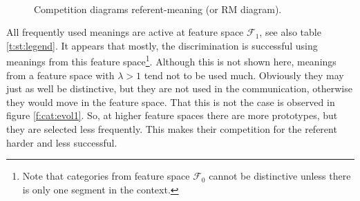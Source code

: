 \begin{figure}[t]
\centering
{}
\\
\caption{Competition diagrams referent-meaning (or RM diagram).}
\label{f:st:compRC}
\end{figure}


All frequently used meanings are active at feature space ${\mathcal F}_1$, see also table \ref{t:st:legend}. It appears that mostly, the discrimination is successful using meanings from this feature space\footnote{Note that categories from feature space ${\mathcal F}_0$ cannot be distinctive unless there is only one segment in the context.}. Although this is not shown here, meanings from a feature space with $\lambda>1$ tend not to be used much. Obviously they may just as well be distinctive, but they are not used in the communication, otherwise they would move in the feature space. That this is not the case is observed in figure \ref{f:cat:evol1}. So, at higher feature spaces there are more prototypes, but they are selected less frequently. This makes their competition for the referent harder and less successful.

